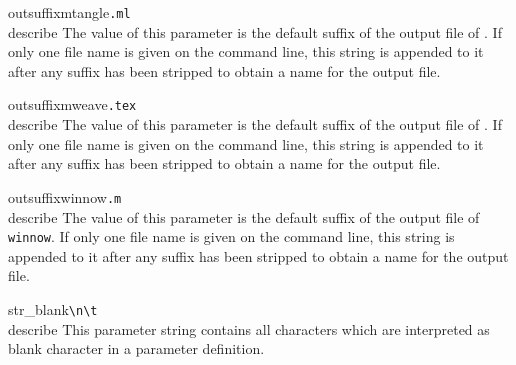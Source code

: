 \begin{describepara}{outsuffixmtangle}{\verb*|.ml|}\\describe
The value of this parameter is the default suffix of the output file
of \tangle. If only one file name is given on the command line,
this string is appended to it after any suffix has been stripped to
obtain a name for the output file.
\end{describepara}
\begin{describepara}{outsuffixmweave}{\verb*|.tex|}\\describe
The value of this parameter is the default suffix of the output file
of \weave. If only one file name is given on the command line,
this string is appended to it after any suffix has been stripped to
obtain a name for the output file.\end{describepara}
\begin{describepara}{outsuffixwinnow}{\verb*|.m|}\\describe
The value of this parameter is the default suffix of the output file
of {\tt winnow}. If only one file name is given on the command line,
this string is appended to it after any suffix has been stripped to
obtain a name for the output file.
\end{describepara}
\begin{describepara}{str_blank}{\verb*|\n\t |}\\describe
This parameter string contains all characters which are interpreted as
blank character in a parameter definition.
\end{describepara}
